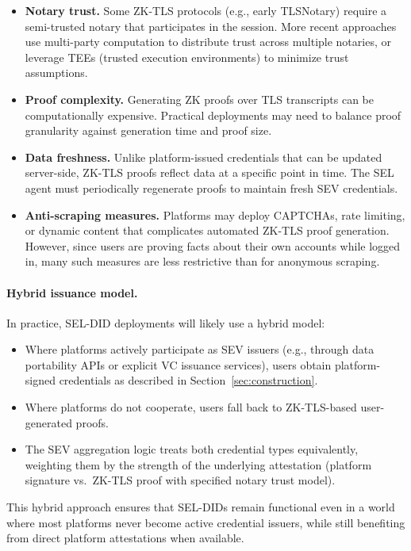 \documentclass[11pt]{article}
\begin{document}
\begin{itemize}
  \item \textbf{Notary trust.} Some ZK-TLS protocols (e.g., early TLSNotary) require a semi-trusted notary that participates in the session. More recent approaches use multi-party computation to distribute trust across multiple notaries, or leverage TEEs (trusted execution environments) to minimize trust assumptions.
  \item \textbf{Proof complexity.} Generating ZK proofs over TLS transcripts can be computationally expensive. Practical deployments may need to balance proof granularity against generation time and proof size.
  \item \textbf{Data freshness.} Unlike platform-issued credentials that can be updated server-side, ZK-TLS proofs reflect data at a specific point in time. The SEL agent must periodically regenerate proofs to maintain fresh SEV credentials.
  \item \textbf{Anti-scraping measures.} Platforms may deploy CAPTCHAs, rate limiting, or dynamic content that complicates automated ZK-TLS proof generation. However, since users are proving facts about their own accounts while logged in, many such measures are less restrictive than for anonymous scraping.
\end{itemize}

\paragraph{Hybrid issuance model.} In practice, SEL-DID deployments will likely use a hybrid model:

\begin{itemize}
  \item Where platforms actively participate as SEV issuers (e.g., through data portability APIs or explicit VC issuance services), users obtain platform-signed credentials as described in Section~\ref{sec:construction}.
  \item Where platforms do not cooperate, users fall back to ZK-TLS-based user-generated proofs.
  \item The SEV aggregation logic treats both credential types equivalently, weighting them by the strength of the underlying attestation (platform signature vs.\ ZK-TLS proof with specified notary trust model).
\end{itemize}

This hybrid approach ensures that SEL-DIDs remain functional even in a world where most platforms never become active credential issuers, while still benefiting from direct platform attestations when available.
\end{document}
